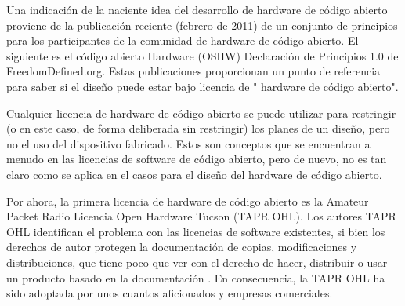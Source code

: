 Una indicación de la naciente idea del desarrollo de hardware de código abierto proviene de la publicación reciente (febrero de 2011) de un conjunto de principios para los participantes de la comunidad de hardware de código abierto. El siguiente es el código abierto Hardware (OSHW) Declaración de Principios 1.0 de FreedomDefined.org. Estas publicaciones proporcionan un punto de referencia para saber si el diseño puede estar bajo licencia de " hardware de código abierto".


Cualquier licencia de hardware de código abierto se puede utilizar para restringir (o en este caso, de forma deliberada sin restringir) los planes de un diseño, pero no el uso del dispositivo fabricado. Estos son conceptos que se encuentran a menudo en las licencias de software de código abierto, pero de nuevo, no es tan claro como se aplica en el casos para el diseño del hardware de código abierto.

Por ahora, la primera licencia de hardware de código abierto es la  Amateur Packet Radio Licencia Open Hardware Tucson (TAPR OHL). Los autores TAPR OHL  identifican el problema con las licencias de software existentes, si bien los derechos de autor protegen la documentación de copias, modificaciones y distribuciones, que tiene poco que ver con el derecho de hacer, distribuir o usar un producto basado en la documentación \cite{Etiqueta12}. En consecuencia, la TAPR OHL ha sido adoptada por unos cuantos aficionados y empresas comerciales.


